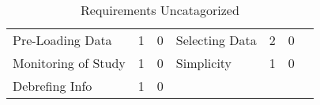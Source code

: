 \begin{table}[htbp]
\begin{tabular}{lcclccc}
        Pre-Loading Data                                           & 1                          & 0                         & Selecting Data                                              & 2                          & 0                         \\
        Monitoring of Study                                        & 1                          & 0                         & Simplicity                                                  & 1                          & 0                         \\
        Debrefing Info                                             & 1                          & 0                         & & & & \\\hline
        \end{tabular}
        \caption[Requirements Uncatagorized]{Requirements Uncatagorized}\label{tab:requirementsRaw1}
        \end{table}



